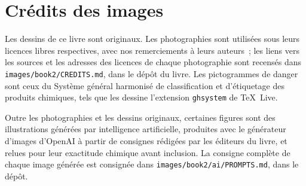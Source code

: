 \chapter*{Crédits des images}

Les dessins de ce livre sont originaux. Les photographies sont utilisées
sous leurs licences libres respectives, avec nos remerciements à leurs
auteurs~; les liens vers les sources et les adresses des licences de
chaque photographie sont recensés dans
\texttt{images/book2/CREDITS.md}, dans le dépôt du livre.
Les pictogrammes de danger sont ceux du Système général harmonisé de
classification et d'étiquetage des produits chimiques, tels que les
dessine l'extension \texttt{ghsystem} de \TeX\ Live.

\bigskip
Outre les photographies et les dessins originaux, certaines figures sont
des illustrations générées par intelligence artificielle, produites avec
le générateur d'images d'OpenAI à partir de consignes rédigées par les
éditeurs du livre, et relues pour leur exactitude chimique avant
inclusion. La consigne complète de chaque image générée est consignée
dans \texttt{images/book2/ai/PROMPTS.md}, dans le dépôt.

